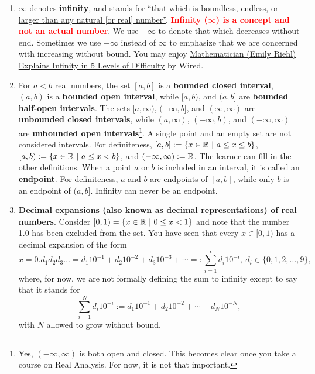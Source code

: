 \begin{tcolorbox}[colback = mylightblue, title=\textbf{Given the above as motivation, we define a set of symbols that we will frequently use in the course:}, breakable]
\begin{definition}
\begin{enumerate}
        
                
        \item $\infty$ denotes \textbf{infinity}, and stands for \href{https://en.wikipedia.org/wiki/Infinity}{``that which is boundless, endless, or larger than any natural [or real] number''}. \textcolor{red}{\bf Infinity ($\infty$) is a concept and not an actual number}. We use $-\infty$ to denote that which decreases without end. Sometimes we use $+\infty$ instead of $\infty$ to emphasize that we are concerned with increasing without bound. You may enjoy \href{https://youtu.be/Vp570S6Plt8}{Mathematician (Emily Riehl) Explains Infinity in 5 Levels of Difficulty} by Wired.

        \item For $a < b$ real numbers, the set $[a, b]$ is a \textbf{bounded closed interval}, $(a, b)$ is a \textbf{bounded open interval}, while $[a, b)$, and $(a, b]$ are \textbf{bounded half-open intervals}. The sets $[a, \infty)$, $(-\infty, b]$, and $(\infty, \infty)$ are \textbf{unbounded closed intervals}, while $(a, \infty)$, $(-\infty, b)$, and $(-\infty, \infty)$ are \textbf{unbounded open intervals}\footnote{Yes, $(-\infty, \infty)$ is both open and closed. This becomes clear once you take a course on Real Analysis. For now, it is not that important.}. A single point and an empty set are not considered intervals. For definiteness, $[a, b]:=\{ x\in \mathbb R~|~ a \le x \le b\}$, $[a, b):=\{ x\in \mathbb R~|~ a \le x < b\}$, and  $(-\infty, \infty):= \mathbb R$. The learner can fill in the other definitions. When a point $a$ or $b$ is included in an interval, it is called an \textbf{endpoint}. For definiteness, $a$ and $b$ are endpoints of $[a, b]$, while only $b$ is an endpoint of $(a, b]$. Infinity can never be an endpoint. 

        \item \textbf{Decimal expansions (also known as decimal representations) of real numbers}. Consider $[0, 1) = \{ x \in \mathbb R~|~ 0 \le x < 1\}$ and note that the number 1.0 has been excluded from the set. You have seen that every $x\in [0, 1)$ has a decimal expansion of the form
        $$x = 0.d_1 d_2 d_3 \ldots = d_1 10^{-1} + d_2 10^{-2} + d_3 10^{-3} + \cdots =: \sum_{i=1}^\infty d_i 10^{-i},~d_i \in \{0, 1, 2, \ldots, 9\},$$
        where, for now, we are not formally defining the sum to infinity except to say that it stands for 
        $$\sum_{i=1}^N d_i 10^{-i}:=  d_1 10^{-1} + d_2 10^{-2} + \cdots +  d_N 10^{-N},$$
        with $N$ allowed to grow without bound. \\
        

\end{enumerate}
\end{definition}
\end{tcolorbox}
